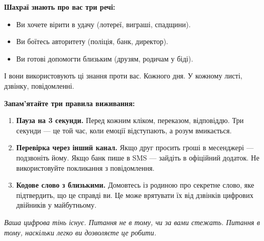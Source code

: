 \vspace{0.2cm}

\newpage

\textbf{Шахраї знають про вас три речі:}

\begin{itemize}[itemsep=0pt, parsep=2pt]
    \item Ви хочете вірити в удачу (лотереї, виграші, спадщини).
    \item Ви боїтесь авторитету (поліція, банк, директор).
    \item Ви готові допомогти близьким (друзям, родичам у біді).
\end{itemize}

\vspace{0.2cm}

І вони використовують ці знання проти вас. Кожного дня. У кожному листі, дзвінку, повідомленні.

\vspace{0.3cm}

\textbf{Запам'ятайте три правила виживання:}

\begin{enumerate}[itemsep=3pt, parsep=0pt]
    \item \textbf{Пауза на 3 секунди.} Перед кожним кліком, переказом, відповіддю. Три секунди — це той час, коли емоції відступають, а розум вмикається.
    
    \item \textbf{Перевірка через інший канал.} Якщо друг просить гроші в месенджері — подзвоніть йому. Якщо банк пише в SMS — зайдіть в офіційний додаток. Не використовуйте покликання з повідомлення.
    
    \item \textbf{Кодове слово з близькими.} Домовтесь із родиною про секретне слово, яке підтвердить, що це справді ви. Це може врятувати їх від дзвінків цифрових двійників у майбутньому.
\end{enumerate}

\vspace{0.3cm}

\begin{center}
\end{center}

\vspace{0.3cm}

\textit{Ваша цифрова тінь існує. Питання не в тому, чи за вами стежать. Питання в тому, наскільки легко ви дозволяєте це робити.}

\normalsize
